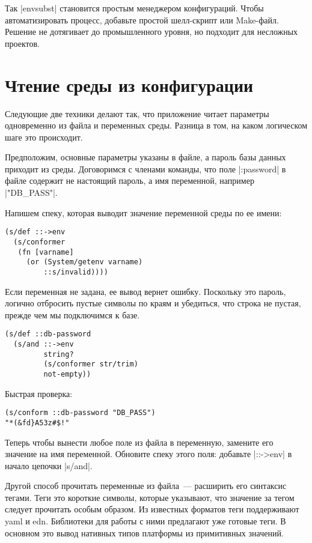 Так \spverb|envsubst| становится простым менеджером конфигураций. Чтобы
автоматизировать процесс, добавьте простой шелл-скрипт или Make-файл. Решение не
дотягивает до промышленного уровня, но подходит для несложных проектов.

\section{Чтение среды из конфигурации}

Следующие две техники делают так, что приложение читает параметры одновременно
из файла и переменных среды. Разница в том, на каком логическом шаге это
происходит.

Предположим, основные параметры указаны в файле, а пароль базы данных приходит
из среды. Договоримся с членами команды, что поле \spverb|:password| в файле содержит не
настоящий пароль, а имя переменной, например \spverb|"DB_PASS"|.

Напишем спеку, которая выводит значение переменной среды по ее имени:

\begin{verbatim}
(s/def ::->env
  (s/conformer
   (fn [varname]
     (or (System/getenv varname)
         ::s/invalid))))
\end{verbatim}

Если переменная не задана, ее вывод вернет ошибку. Поскольку это пароль, логично
отбросить пустые символы по краям и убедиться, что строка не пустая, прежде чем
мы подключимся к базе.

\begin{verbatim}
(s/def ::db-password
  (s/and ::->env
         string?
         (s/conformer str/trim)
         not-empty))
\end{verbatim}

Быстрая проверка:

\begin{verbatim}
(s/conform ::db-password "DB_PASS")
"*(&fd}A53z#$!"
\end{verbatim}

Теперь чтобы вынести любое поле из файла в переменную, замените его значение на
имя переменной. Обновите спеку этого поля: добавьте \spverb|::->env| в начало цепочки
\spverb|s/and|.

Другой способ прочитать переменные из файла~--- расширить его синтаксис
тегами. Теги это короткие символы, которые указывают, что значение за тегом
следует прочитать особым образом. Из известных форматов теги поддерживают yaml и
edn. Библиотеки для работы с ними предлагают уже готовые теги. В основном это
вывод нативных типов платформы из примитивных значений.

